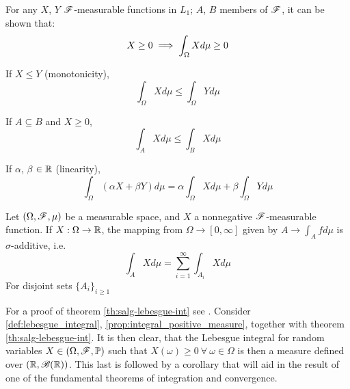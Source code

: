 \documentclass[../TGMAFFIRO.tex]{subfiles}
\begin{document}
\begin{proposition} \label{prop:lebesgue_integral_props}
	For any $X$, $Y$ $\mathscr{F}$-measurable functions in $L_1$; $A$, $B$ members of $\mathscr{F}$, it can be shown that:
	\begin{equation}\label{prop:integral_positive_measure}
		X \geq 0 \implies \int_\Omega X d\mu \geq 0 \\
	\end{equation}
	
	If $X \leq Y$ (monotonicity),
	\begin{equation}
		\int_\Omega X d\mu \leq \int_\Omega Y d\mu
	\end{equation}
	
	If $A \subseteq B$ and $X \geq 0$,
	\begin{equation}
		\int_A X d\mu \leq \int_B X d\mu
	\end{equation}
	
	If $\alpha$, $\beta$ $\in \mathbb{R}$ (linearity),
	\begin{equation}
	\int_\Omega (\alpha X + \beta Y) d\mu = \alpha \int_\Omega X d\mu + \beta \int_\Omega Y d\mu
	\end{equation}
\end{proposition}


\begin{theorem} \label{th:salg-lebesgue-int}
	Let $(\Omega, \mathscr{F}, \mu)$ be a measurable space, and $X$ a nonnegative $\mathscr{F}$-measurable function. If $X: \Omega \to \mathbb{R}$, the mapping from $\Omega \to [0, \infty]$ given by $A \to \int_A f d\mu$ is $\sigma$-additive, i.e.
	\begin{equation}
		\int_A X d\mu = \sum_{i=1}^{\infty}\int_{A_i} X d\mu
	\end{equation}
	For disjoint sets $\{A_i\}_{i\geq1}$
\end{theorem}

For a proof of theorem \ref{th:salg-lebesgue-int} see . Consider \ref{def:lebesgue_integral}, \ref{prop:integral_positive_measure}, together with theorem \ref{th:salg-lebesgue-int}. It is then clear, that the Lebesgue integral for random variables $X \in (\Omega, \mathscr{F}, \mathbb{P})$ such that $X(\omega) \geq 0 \ \forall \ \omega \in \Omega$ is then a measure defined over $(\mathbb{R}, \mathscr{B}(\mathbb{R}))$. This last is followed by a corollary that will aid in the result of one of the fundamental theorems of integration and convergence. 
\end{document}
